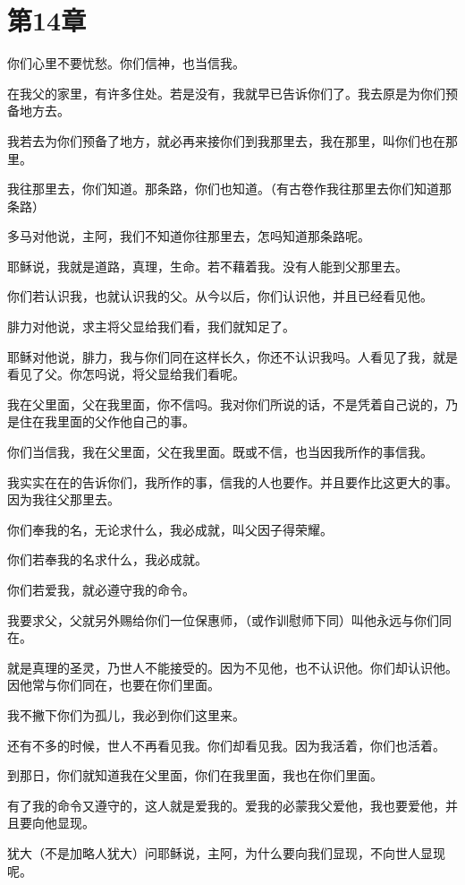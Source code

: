 \documentclass[12pt,oneside]{book}
\begin{document}
\chapter{第14章}
你们心里不要忧愁。你们信神，也当信我。

在我父的家里，有许多住处。若是没有，我就早已告诉你们了。我去原是为你们预备地方去。

我若去为你们预备了地方，就必再来接你们到我那里去，我在那里，叫你们也在那里。

我往那里去，你们知道。那条路，你们也知道。（有古卷作我往那里去你们知道那条路）

多马对他说，主阿，我们不知道你往那里去，怎吗知道那条路呢。

耶稣说，我就是道路，真理，生命。若不藉着我。没有人能到父那里去。

你们若认识我，也就认识我的父。从今以后，你们认识他，并且已经看见他。

腓力对他说，求主将父显给我们看，我们就知足了。

耶稣对他说，腓力，我与你们同在这样长久，你还不认识我吗。人看见了我，就是看见了父。你怎吗说，将父显给我们看呢。

我在父里面，父在我里面，你不信吗。我对你们所说的话，不是凭着自己说的，乃是住在我里面的父作他自己的事。

你们当信我，我在父里面，父在我里面。既或不信，也当因我所作的事信我。

我实实在在的告诉你们，我所作的事，信我的人也要作。并且要作比这更大的事。因为我往父那里去。

你们奉我的名，无论求什么，我必成就，叫父因子得荣耀。

你们若奉我的名求什么，我必成就。

你们若爱我，就必遵守我的命令。

我要求父，父就另外赐给你们一位保惠师，（或作训慰师下同）叫他永远与你们同在。

就是真理的圣灵，乃世人不能接受的。因为不见他，也不认识他。你们却认识他。因他常与你们同在，也要在你们里面。

我不撇下你们为孤儿，我必到你们这里来。

还有不多的时候，世人不再看见我。你们却看见我。因为我活着，你们也活着。

到那日，你们就知道我在父里面，你们在我里面，我也在你们里面。

有了我的命令又遵守的，这人就是爱我的。爱我的必蒙我父爱他，我也要爱他，并且要向他显现。

犹大（不是加略人犹大）问耶稣说，主阿，为什么要向我们显现，不向世人显现呢。
\end{document}
